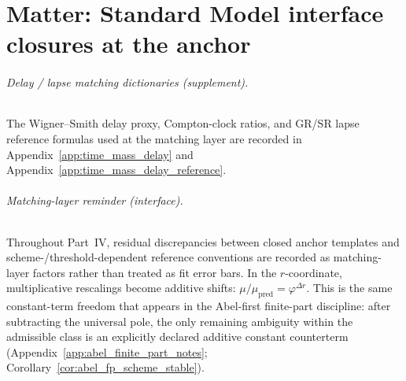 \part{Matter: Standard Model interface closures at the anchor}





\paragraph{Delay / lapse matching dictionaries (supplement).}
\MatchTag The Wigner--Smith delay proxy, Compton-clock ratios, and GR/SR lapse reference formulas used at the matching layer are recorded in Appendix~\ref{app:time_mass_delay} and Appendix~\ref{app:time_mass_delay_reference}.

\paragraph{Matching-layer reminder (interface).}
\InterfaceTag Throughout Part~IV, residual discrepancies between closed anchor templates and scheme-/threshold-dependent reference conventions are recorded as matching-layer factors rather than treated as fit error bars.
In the $r$-coordinate, multiplicative rescalings become additive shifts: $\mu/\mu_{\mathrm{pred}}=\varphi^{\Delta r}$.
This is the same constant-term freedom that appears in the Abel-first finite-part discipline: after subtracting the universal pole, the only remaining ambiguity within the admissible class is an explicitly declared additive constant counterterm (Appendix~\ref{app:abel_finite_part_notes}; Corollary~\ref{cor:abel_fp_scheme_stable}).




